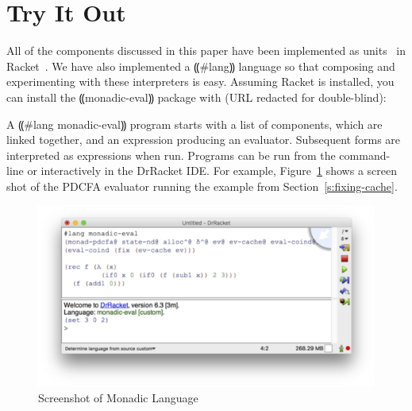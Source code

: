 \section{Try It Out}

All of the components discussed in this paper have been implemented as
units~\cite{local:flatt-pldi98} in Racket~\cite{dvanhorn:plt-tr1}.  We have
also implemented a ⸨#lang⸩ language so that composing and experimenting with
these interpreters is easy.  Assuming Racket is installed, you can install the
⸨monadic-eval⸩ package with (URL redacted for double-blind):

A ⸨#lang monadic-eval⸩ program starts with a list of
components, which are linked together, and an expression producing an
evaluator.  Subsequent forms are interpreted as expressions when run.
Programs can be run from the command-line or interactively in the
DrRacket IDE.  For example, Figure~\ref{f:screen} shows a screen shot of the PDCFA
evaluator running the example from Section~\ref{s:fixing-cache}.

\begin{figure}
\includegraphics[width=\linewidth]{screen.png}
\caption{Screenshot of Monadic Language}
\label{f:screen}
\end{figure}
